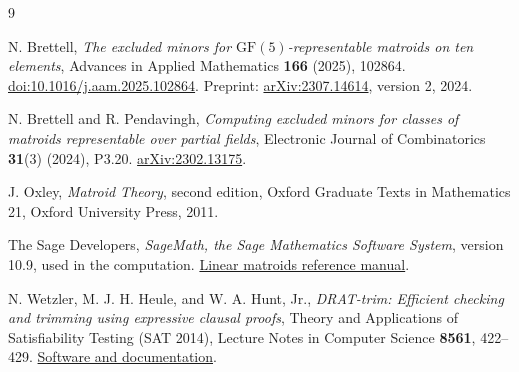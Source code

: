 \documentclass[11pt,a4paper]{article}
\theoremstyle{definition}
\begin{document}
\begin{thebibliography}{9}

N. Brettell,
\emph{The excluded minors for $\mathrm{GF}(5)$-representable matroids
on ten elements},
Advances in Applied Mathematics \textbf{166} (2025), 102864.
\href{https://doi.org/10.1016/j.aam.2025.102864}{doi:10.1016/j.aam.2025.102864}.
Preprint: \href{https://arxiv.org/abs/2307.14614}{arXiv:2307.14614},
version 2, 2024.

N. Brettell and R. Pendavingh,
\emph{Computing excluded minors for classes of matroids representable
over partial fields},
Electronic Journal of Combinatorics \textbf{31}(3) (2024), P3.20.
\href{https://arxiv.org/abs/2302.13175}{arXiv:2302.13175}.

J. Oxley,
\emph{Matroid Theory}, second edition,
Oxford Graduate Texts in Mathematics 21,
Oxford University Press, 2011.

The Sage Developers,
\emph{SageMath, the Sage Mathematics Software System},
version 10.9, used in the computation.
\href{https://doc.sagemath.org/html/en/reference/matroids/sage/matroids/linear_matroid.html}{Linear matroids reference manual}.

N. Wetzler, M. J. H. Heule, and W. A. Hunt, Jr.,
\emph{DRAT-trim: Efficient checking and trimming using expressive
clausal proofs},
Theory and Applications of Satisfiability Testing (SAT 2014),
Lecture Notes in Computer Science \textbf{8561}, 422--429.
\href{https://www.cs.utexas.edu/~marijn/drat-trim/}{Software and documentation}.

\end{thebibliography}
\end{document}

